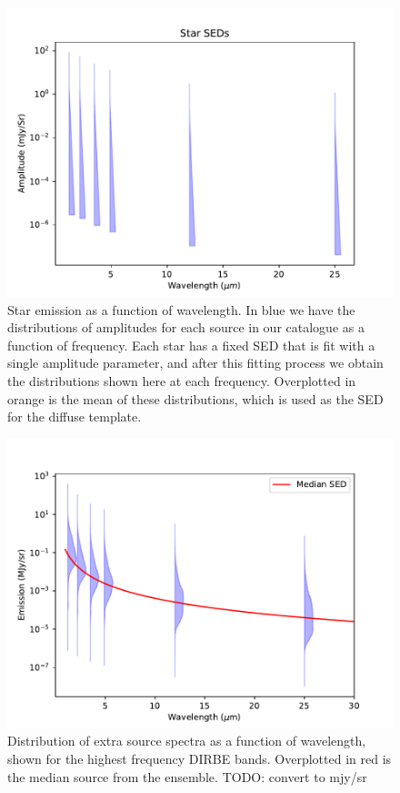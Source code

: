 \documentclass{aa}
\begin{document}
\begin{figure}
  \includegraphics[width=\columnwidth]{figs/starseds/star_seds.pdf}
  \caption{Star emission as a function of wavelength. In blue we have the distributions of amplitudes for each source in our catalogue as a function of frequency. Each star has a fixed SED that is fit with a single amplitude parameter, and after this fitting process we obtain the distributions shown here at each frequency. Overplotted in orange is the mean of these distributions, which is used as the SED for the diffuse template.}
  \label{fig:starSEDs}
\end{figure}

\begin{figure}
  \includegraphics[width=\columnwidth]{figs/starseds/exgal_spectra.pdf}
  \caption{Distribution of extra source spectra as a function of wavelength, shown for the highest frequency DIRBE bands. Overplotted in red is the median source from the ensemble. TODO: convert to mjy/sr}
  \label{fig:exgalSEDs}
\end{figure}
\end{document}
